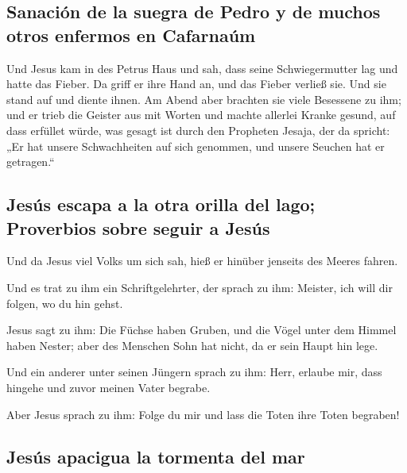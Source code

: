 \hypertarget{sanaciuxf3n-de-la-suegra-de-pedro-y-de-muchos-otros-enfermos-en-cafarnauxfam}{%
\subsection{Sanación de la suegra de Pedro y de muchos otros enfermos en
Cafarnaúm}\label{sanaciuxf3n-de-la-suegra-de-pedro-y-de-muchos-otros-enfermos-en-cafarnauxfam}}

 Und Jesus kam in des Petrus Haus und sah, dass seine
Schwiegermutter lag und hatte das Fieber.  Da griff er
ihre Hand an, und das Fieber verließ sie. Und sie stand auf und diente
ihnen.  Am Abend aber brachten sie viele Besessene zu
ihm; und er trieb die Geister aus mit Worten und machte allerlei Kranke
gesund,  auf dass erfüllet würde, was gesagt ist durch
den Propheten Jesaja, der da spricht: „Er hat unsere Schwachheiten auf
sich genommen, und unsere Seuchen hat er getragen.``

\hypertarget{jesuxfas-escapa-a-la-otra-orilla-del-lago-proverbios-sobre-seguir-a-jesuxfas}{%
\subsection{Jesús escapa a la otra orilla del lago; Proverbios sobre
seguir a
Jesús}\label{jesuxfas-escapa-a-la-otra-orilla-del-lago-proverbios-sobre-seguir-a-jesuxfas}}

 Und da Jesus viel Volks um sich sah, hieß er hinüber
jenseits des Meeres fahren.

 Und es trat zu ihm ein Schriftgelehrter, der sprach zu
ihm: Meister, ich will dir folgen, wo du hin gehst.

 Jesus sagt zu ihm: Die Füchse haben Gruben, und die
Vögel unter dem Himmel haben Nester; aber des Menschen Sohn hat nicht,
da er sein Haupt hin lege.

 Und ein anderer unter seinen Jüngern sprach zu ihm:
Herr, erlaube mir, dass hingehe und zuvor meinen Vater begrabe.

 Aber Jesus sprach zu ihm: Folge du mir und lass die
Toten ihre Toten begraben!

\hypertarget{jesuxfas-apacigua-la-tormenta-del-mar}{%
\subsection{Jesús apacigua la tormenta del
mar}\label{jesuxfas-apacigua-la-tormenta-del-mar}}


